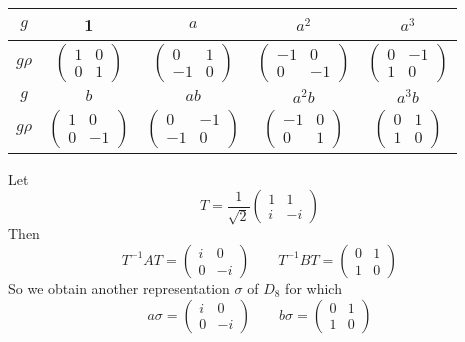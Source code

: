 \begin{table}[h]
	\centering
	\begin{tabular}{|c|c|c|c|c|}
		\hline
		$g$ & 1 & $a$ & $a^2$ & $a^3$ \\
		\hline
		$g \rho$ & $\left(\begin{array}{ll}1 & 0 \\ 0 & 1\end{array}\right)$ & $\left(\begin{array}{rr}0 & 1 \\ -1 & 0\end{array}\right)$ & $\left(\begin{array}{rr}-1 & 0 \\ 0 & -1\end{array}\right)$ & $\left(\begin{array}{rr}0 & -1 \\ 1 & 0\end{array}\right)$ \\
		\hline
		$g$ & $b$ & $a b$ & $a^2 b$ & $a^3 b$ \\
		\hline
		$g \rho$ & $\left(\begin{array}{rr}1 & 0 \\ 0 & -1\end{array}\right)$ & $\left(\begin{array}{rr}0 & -1 \\ -1 & 0\end{array}\right)$ & $\left(\begin{array}{rr}-1 & 0 \\ 0 & 1\end{array}\right)$ & $\left(\begin{array}{ll}0 & 1 \\ 1 & 0\end{array}\right)$ \\
		\hline
	\end{tabular}
\end{table}
Let
\[
T=\frac{1}{\sqrt{ 2 }}\begin{pmatrix}
1 & 1  \\
 i & -i 
\end{pmatrix} 
\]
Then
\[
T^{-1}AT=\begin{pmatrix}
i & 0 \\
0 & -i 
\end{pmatrix}\qquad T^{-1}BT=\begin{pmatrix}
0 & 1 \\
1 & 0
\end{pmatrix}
\]
So we obtain another representation $\sigma$ of $D_8$ for which
\[
a\sigma=\begin{pmatrix}
 i & 0 \\
0 & -i 
\end{pmatrix}\qquad b\sigma=\begin{pmatrix}
0 & 1  \\
1 & 0
\end{pmatrix}
\]
